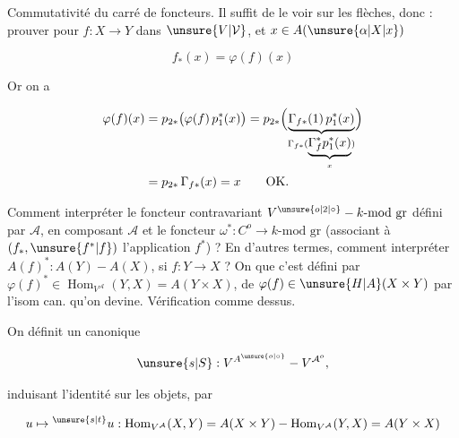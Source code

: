 Commutativité du carré de foncteurs. Il suffit de le voir sur les flèches, donc : prouver pour $f:X\to Y$ dans $\unsure{V|\mathcal V}$, et $x\in A(\unsure{\alpha|X|x})$

\[
f_*(x)=\varphi(f)(x)
\]

Or on a


\[
\begin{aligned}
\varphi(f)(x)&=p_{2*}\bigl(\varphi(f)\,p_1^*(x)\bigr)
=p_{2*}\Bigl(\underbrace{\Gamma_{f*}(1)\,p_1^*(x)}_{\Gamma_{f*}(\underbrace{\Gamma_f^*p_1^*(x)}_{x})}\Bigr)\\
&=p_{2*}\,\Gamma_{f*}(x)=x\qquad\text{OK.}
\end{aligned}
\]

\uline{}  Comment interpréter le foncteur contravariant $V^{\unsure{o|2|\circ}}\mathbin{-}k\text{-mod gr}$ défini par $\mathcal A$, en composant $\mathcal A$ et le foncteur $\omega^*:C^o\longrightarrow k\text{-mod gr}$ (associant à $(f_*,\unsure{f^*|f})$ l'application $f^*$) ? En d'autres termes, comment interpréter $A(f)^*:A(Y)\mathbin{-}A(X)$, si $f:Y\longrightarrow X$ ? On  que c'est défini par $\varphi(f)^*\in\operatorname{Hom}_{V^{\mathcal A}}(Y,X)=A(Y\times X)$,  de $\varphi(f)\in\unsure{H|A}(X\times Y)$ par l'isom can. qu'on devine. Vérification comme dessus.

On définit un  canonique

\[
\unsure{s|S}:V^{A^{\unsure{o|\circ}}}\mathbin{-}V^{\mathcal A^{o}},
\]


induisant l'identité sur les objets, par

\[
u\mapsto{}^{\unsure{s|t}}u:\operatorname{Hom}_{V^{\mathcal A}}(X,Y)=A(X\times Y)\mathbin{-}\operatorname{Hom}_{V^{\mathcal A}}(Y,X)=A(Y\times X)
\]

